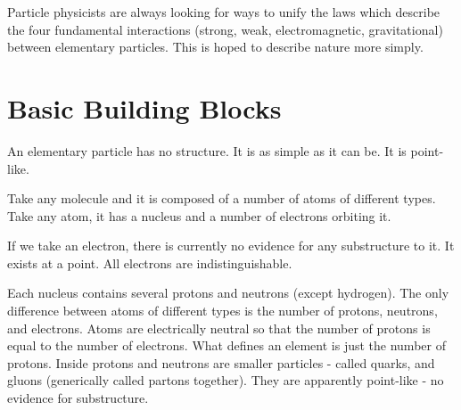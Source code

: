 \documentclass[10pt,a4paper]{article}
\begin{document}
Particle physicists are always looking for ways to unify the laws which describe the four fundamental interactions (strong, weak, electromagnetic, gravitational) between elementary particles. This is hoped to describe nature more simply.

\section*{Basic Building Blocks}

An elementary particle has no structure. It is as simple as it can be. It is point-like.

Take any molecule and it is composed of a number of atoms of different types. Take any atom, it has a nucleus and a number of electrons orbiting it.

If we take an electron, there is currently no evidence for any substructure to it. It exists at a point. All electrons are indistinguishable.

Each nucleus contains several protons and neutrons (except hydrogen). The only difference between atoms of different types is the number of protons, neutrons, and electrons. Atoms are electrically neutral so that the number of protons is equal to the number of electrons. What defines an element is just the number of protons. Inside protons and neutrons are smaller particles - called quarks, and gluons (generically called partons together). They are apparently point-like - no evidence for substructure.
\end{document}
